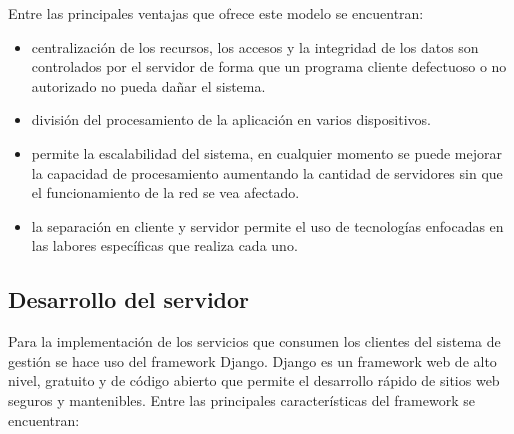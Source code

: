 Entre las principales ventajas que ofrece este modelo se encuentran:

\begin{itemize}
    \item centralización de los recursos, los accesos y la integridad de los datos son controlados por el servidor de forma que un programa cliente defectuoso o no autorizado no pueda dañar el sistema.
    \item división del procesamiento de la aplicación en varios dispositivos.
    \item permite la escalabilidad del sistema, en cualquier momento se puede mejorar la capacidad de procesamiento aumentando la cantidad de servidores sin que el funcionamiento de la red se vea afectado.
    \item la separación en cliente y servidor permite el uso de tecnologías enfocadas en las labores específicas que realiza cada uno. 
\end{itemize}
 


\subsection{Desarrollo del servidor}
Para la implementación de los servicios que consumen los clientes del 
sistema de gestión se hace uso del framework Django. Django es un framework
web de alto nivel, gratuito y de código abierto que permite el desarrollo rápido de 
sitios web seguros y mantenibles. Entre las principales características
del framework se encuentran:

